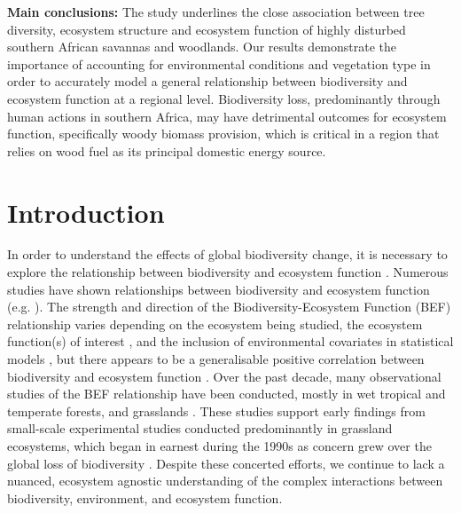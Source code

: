 \documentclass[11pt,a4paper]{article}
\begin{document}
\textbf{Main conclusions:} The study underlines the close association between tree diversity, ecosystem structure and ecosystem function of highly disturbed southern African savannas and woodlands. Our results demonstrate the importance of accounting for environmental conditions and vegetation type in order to accurately model a general relationship between biodiversity and ecosystem function at a regional level. Biodiversity loss, predominantly through human actions in southern Africa, may have detrimental outcomes for ecosystem function, specifically woody biomass provision, which is critical in a region that relies on wood fuel as its principal domestic energy source.


\section{Introduction}

In order to understand the effects of global biodiversity change, it is necessary to explore the relationship between biodiversity and ecosystem function \citep{Tilman2014}. Numerous studies have shown relationships between biodiversity and ecosystem function (e.g. \citealt{Liang2016, Hooper2012, Cardinale2009}). The strength and direction of the Biodiversity-Ecosystem Function (BEF) relationship varies depending on the ecosystem being studied, the ecosystem function(s) of interest \citep{Hector2007}, and the inclusion of environmental covariates in statistical models \citep{Vila2005}, but there appears to be a generalisable positive correlation between biodiversity and ecosystem function \citep{Liang2016}. Over the past decade, many observational studies of the BEF relationship have been conducted, mostly in wet tropical and temperate forests, and grasslands \citep{Chen2011}. These studies support early findings from small-scale experimental studies conducted predominantly in grassland ecosystems, which began in earnest during the 1990s as concern grew over the global loss of biodiversity \citep{Tilman1994, Tilman2014}. Despite these concerted efforts, we continue to lack a nuanced, ecosystem agnostic understanding of the complex interactions between biodiversity, environment, and ecosystem function.
\end{document}
